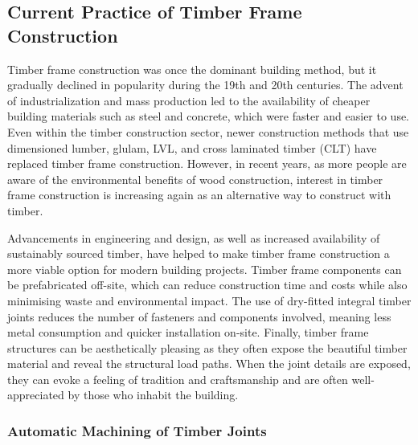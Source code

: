 \subsection{Current Practice of Timber Frame Construction}
\label{subsection:introduction_current_practice_of_timber_frame_construction}

Timber frame construction was once the dominant building method, but it gradually declined in popularity during the 19th and 20th centuries. The advent of industrialization and mass production led to the availability of cheaper building materials such as steel and concrete, which were faster and easier to use. Even within the timber construction sector, newer construction methods that use dimensioned lumber, glulam, LVL, and cross laminated timber (CLT) have replaced timber frame construction. However, in recent years, as more people are aware of the environmental benefits of wood construction, interest in timber frame construction is increasing again as an alternative way to construct with timber. 

Advancements in engineering and design, as well as increased availability of sustainably sourced timber, have helped to make timber frame construction a more viable option for modern building projects. Timber frame components can be prefabricated off-site, which can reduce construction time and costs while also minimising waste and environmental impact. The use of dry-fitted integral timber joints reduces the number of fasteners and components involved, meaning less metal consumption and quicker installation on-site. Finally, timber frame structures can be aesthetically pleasing as they often expose the beautiful timber material and reveal the structural load paths. When the joint details are exposed, they can evoke a feeling of tradition and craftsmanship and are often well-appreciated by those who inhabit the building.

\subsubsection{Automatic Machining of Timber Joints}
\label{subsubsection:introduction_automatic_machining_of_timber_joints}

